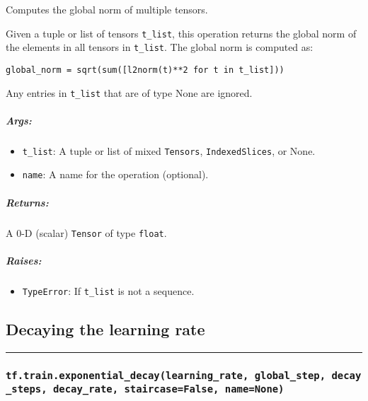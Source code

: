 Computes the global norm of multiple tensors.

Given a tuple or list of tensors \texttt{t\_list}, this operation
returns the global norm of the elements in all tensors in
\texttt{t\_list}. The global norm is computed as:

\texttt{global\_norm\ =\ sqrt(sum({[}l2norm(t)**2\ for\ t\ in\ t\_list{]}))}

Any entries in \texttt{t\_list} that are of type None are ignored.

\subparagraph{Args: }\label{args-17}

\begin{itemize}
\tightlist
\item
  \texttt{t\_list}: A tuple or list of mixed \texttt{Tensors},
  \texttt{IndexedSlices}, or None.
\item
  \texttt{name}: A name for the operation (optional).
\end{itemize}

\subparagraph{Returns: }\label{returns-11}

A 0-D (scalar) \texttt{Tensor} of type \texttt{float}.

\subparagraph{Raises: }\label{raises-8}

\begin{itemize}
\tightlist
\item
  \texttt{TypeError}: If \texttt{t\_list} is not a sequence.
\end{itemize}

\subsection{Decaying the learning rate
}\label{decaying-the-learning-rate}

\begin{center}\rule{0.5\linewidth}{\linethickness}\end{center}

\subsubsection{\texorpdfstring{\texttt{tf.train.exponential\_decay(learning\_rate,\ global\_step,\ decay\_steps,\ decay\_rate,\ staircase=False,\ name=None)}
}{tf.train.exponential\_decay(learning\_rate, global\_step, decay\_steps, decay\_rate, staircase=False, name=None) }}\label{tf.train.exponentialux5fdecaylearningux5frate-globalux5fstep-decayux5fsteps-decayux5frate-staircasefalse-namenone}

